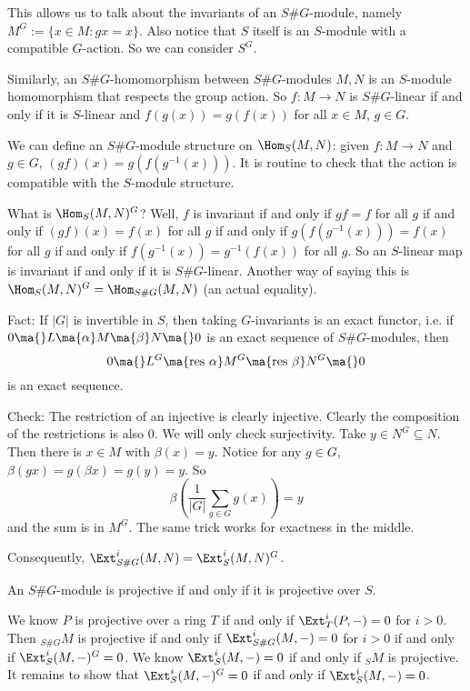 \begin{rem}
This allows us to talk about the invariants of an $S\#G$-module, namely $M^G:= \{ x \in M \colon gx=x \}$. Also notice that $S$ itself is an $S$-module with a compatible $G$-action. So we can consider $S^G$.
\end{rem}

Similarly, an $S\#G$-homomorphism between $S\#G$-modules $M,N$ is an $S$-module homomorphism that respects the group action. So $f: M \to N$ is $S\#G$-linear if and only if it is $S$-linear and $f(g(x))=g(f(x))$ for all $x \in M$, $g \in G$. 


We can define an $S\#G$-module structure on $\Hom_S(M,N)$: given $f: M \to N$ and $g \in G$, $(gf)(x)= g(f(g^{-1}(x)))$. It is routine to check that the action is compatible with the $S$-module structure. 


What is $\Hom_S(M,N)^G$? Well, $f$ is invariant if and only if $gf=f$ for all $g$ if and only if $(gf)(x)= f(x)$ for all $g$ if and only if $g(f(g^{-1}(x)))= f(x)$ for all $g$ if and only if $f(g^{-1}(x))= g^{-1}(f(x))$ for all $g$. So an $S$-linear map is invariant if and only if it is $S\#G$-linear. Another way of saying this is $\Hom_S(M,N)^G= \Hom_{S\#G}(M,N)$ (an actual equality). 


Fact: If $|G|$ is invertible in $S$, then taking $G$-invariants is an exact functor, i.e. if $0 \ma{} L \ma{\alpha} M \ma{\beta} N \ma{} 0$ is an exact sequence of $S\#G$-modules, then
	\[
	0 \ma{} L^G \ma{\text{res }\alpha} M^G \ma{\text{res }\beta} N^G \ma{} 0
	\]
is an exact sequence. 

Check: The restriction of an injective is clearly injective. Clearly the composition of the restrictions is also 0. We will only check surjectivity. Take $y \in N^G \subseteq N$. Then there is $x \in M$ with $\beta(x)=y$. Notice for any $g \in G$, $\beta(gx)=g(\beta x)=g(y)=y$. So 
	\[
	\beta \left(\dfrac{1}{|G|} \sum_{g \in G} g(x) \right)= y
	\]
and the sum is in $M^G$. The same trick works for exactness in the middle. 


Consequently, $\Ext_{S\#G}^i(M,N)= \Ext_S^i(M,N)^G$. 

\begin{cor}
An $S\#G$-module is projective if and only if it is projective over $S$. 
\end{cor}

\pf We know $P$ is projective over a ring $T$ if and only if $\Ext_T^i(P,-)=0$ for $i>0$. Then $_{S\#G}M$ is projective if and only if $\Ext_{S\#G}^i(M,-)=0$ for $i>0$ if and only if $\Ext_S^i(M,-)^G=0$. We know $\Ext_S^i(M,-)=0$ if and only if $_SM$ is projective. It remains to show that $\Ext_S^i(M,-)^G=0$ if and only if $\Ext_S^i(M,-)=0$. 

